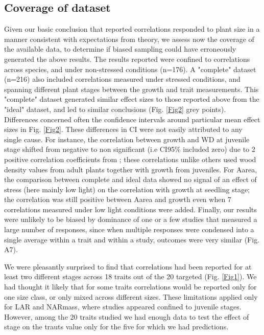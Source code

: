 \documentclass[a4paper]{article}\usepackage[]{graphicx}\usepackage[]{color}
\begin{document}
\subsection*{Coverage of dataset}

Given our basic conclusion that reported correlations responded to plant size in a manner consistent with expectations from theory, we assess now the coverage of the available data, to determine if biased sampling could have erroneously generated the above results. The results reported were confined to correlations across species, and under non-stressed conditions (n=176). A "complete" dataset (n=216) also included correlations measured under stressed conditions, and spanning different plant stages between the growth and trait measurements. This "complete" dataset generated similar effect sizes to those reported above from the "ideal" dataset, and led to similar conclusions (Fig. \ref{Fig2} grey points). Differences concerned often the confidence intervals around particular mean effect sizes in Fig. \ref{Fig2}. These differences in CI were not easily attributed to any single cause. For instance, the correlation between growth and WD at juvenile stage shifted from negative to non significant (i.e CI95\% included zero) due to 2 positive correlation coefficients from \citet{Augspurger:1984ct};  these correlations unlike others used wood density values from adult plants together with growth from juveniles. For Aarea, the comparison between complete and ideal data showed no signal of an effect of stress (here mainly low light) on the correlation with growth at seedling stage; the correlation was still positive between Aarea and growth even when 7 correlations measured under low light conditions were added. Finally, our results were unlikely to be biased by dominance of one or a few studies that measured a large number of responses, since when multiple responses were condensed into a single average within a trait and within a study, outcomes were very similar (Fig. A7).

We were pleasantly surprised to find that correlations had been reported for at least two different stages across 18 traits out of the 20 targeted (Fig. \ref{Fig1}). We had thought it likely that for some traits correlations would be reported only for one size class, or only mixed across different sizes. These limitations applied only for LAR and NARmass, where studies appeared confined to juvenile stages. However, among the 20 traits studied we had enough data to test the effect of stage on the trauts value only for the five for which we had predictions. 
\end{document}
